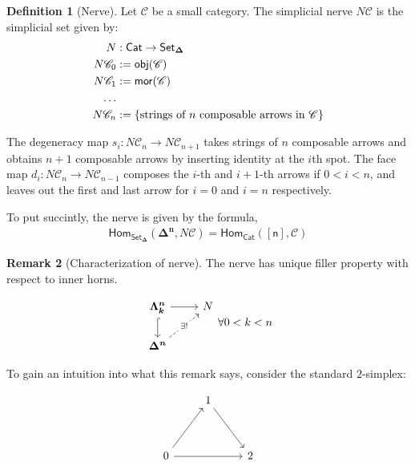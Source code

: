 \documentclass[10pt]{amsart}
\newcommand{\8}{\ensuremath{\infty}}
\newcommand{\0}{\ensuremath{\overset{\rightarrow}{0}}}
\newcommand{\1}{\ensuremath{\mathbf{1}}}
\newcommand{\C}{\ensuremath{\mathscr{C}}}
\newcommand{\obj}{\ensuremath{\mathsf{obj}}}
\newcommand{\mor}{\ensuremath{\mathsf{mor}}}
\newcommand{\Cat}{\ensuremath{\mathsf{Cat}}}
\newcommand{\Hom}{\ensuremath{\mathsf{Hom}}}
\newcommand{\Simplex}[1]{\ensuremath{\boldsymbol{\Delta^{#1}}}}
\newcommand{\Horn}[2]{\ensuremath{\boldsymbol{\Lambda^{#1}_{#2}}}}
\newcommand{\SSet}{\ensuremath{\mathsf{Set}_{\boldsymbol{\Delta}}}}
\newcommand{\sq}[1]{\ensuremath{\mathsf{[#1]}}}
\theoremstyle{definition}
\newtheorem{definition}{Definition}[section]
\newtheorem{remark}[definition]{Remark}
\numberwithin{definition}{subsection}
\numberwithin{definition}{section}
\begin{document}
\begin{definition}[Nerve\label{def:nerve}]
  Let $\C$ be a small category. The simplicial nerve $N\C$ is the simplicial set given by:
  \begin{align*}
    N      & : \Cat \rightarrow \SSet                                   \\
    N\C_0  & := \obj(\C)                                                \\
    N\C_1  & := \mor(\C)                                                \\
    \ldots &                                                            \\
    N\C_n  & := \{\text{strings of } n\text{ composable arrows in \C}\} \\
  \end{align*}

  The degeneracy map $s_i : N\C_n \rightarrow N\C_{n + 1}$ takes strings of $n$ composable arrows and obtains $n + 1$ composable arrows by inserting identity at the $i$th spot. The face map $d_i : N\C_n \rightarrow N\C_{n - 1}$ composes the $i$-th and $i +1$-th arrows if $0 < i < n$, and leaves out the first and last arrow for $i = 0$ and $i = n$ respectively.

  To put succintly, the nerve is given by the formula,
  \begin{align*}
    \Hom_{\SSet}(\Simplex{n}, N\C) = \Hom_\Cat(\sq{n}, \C)
  \end{align*}
\end{definition}

\begin{remark}[Characterization of nerve]
  The nerve has unique filler property with respect to inner horns.

  \begin{equation*}
    \begin{tikzcd}
      \Horn{n}{k} \arrow[d, hookrightarrow] \arrow[r] & N \\
      \Simplex{n} \arrow[ur, dashed, "\exists!" description]
    \end{tikzcd} \forall 0 < k < n
  \end{equation*}
\end{remark}

To gain an intuition into what this remark says, consider the standard $2$-simplex:

\begin{equation*}
  \begin{tikzcd}
    & 1 \arrow[ddr] & \\
    \\
    0 \arrow[uur] \arrow[rr] & & 2
  \end{tikzcd}
\end{equation*}
\end{document}

